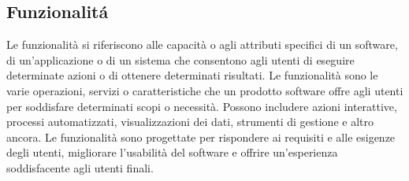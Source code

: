 \subsection{Funzionalitá}
Le funzionalità si riferiscono alle capacità o agli attributi specifici di un
software, di un'applicazione o di un sistema che consentono agli utenti di
eseguire determinate azioni o di ottenere determinati risultati. Le
funzionalità sono le varie operazioni, servizi o caratteristiche che un
prodotto software offre agli utenti per soddisfare determinati scopi o
necessità. Possono includere azioni interattive, processi automatizzati,
visualizzazioni dei dati, strumenti di gestione e altro ancora. Le funzionalità
sono progettate per rispondere ai requisiti e alle esigenze degli utenti,
migliorare l'usabilità del software e offrire un'esperienza soddisfacente agli
utenti finali.
